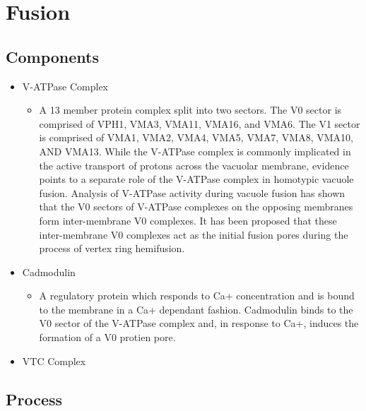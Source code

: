 \documentclass[12pt,twoside]{reedthesis}
\providecommand{\tightlist}{%
  \setlength{\itemsep}{0pt}\setlength{\parskip}{0pt}}
\begin{document}
\section{Fusion}\label{fusion}

\subsection{Components}\label{components-2}

\begin{itemize}
\tightlist
\item
  V-ATPase Complex

  \begin{itemize}
  \tightlist
  \item
    A 13 member protein complex split into two sectors. The V0 sector is comprised of VPH1, VMA3, VMA11, VMA16, and VMA6. The V1 sector is comprised of VMA1, VMA2, VMA4, VMA5, VMA7, VMA8, VMA10, AND VMA13. While the V-ATPase complex is commonly implicated in the active transport of protons across the vacuolar membrane, evidence points to a separate role of the V-ATPase complex in homotypic vacuole fusion. Analysis of V-ATPase activity during vacuole fusion has shown that the V0 sectors of V-ATPase complexes on the opposing membranes form inter-membrane V0 complexes. It has been proposed that these inter-membrane V0 complexes act as the initial fusion pores during the process of vertex ring hemifusion.
  \end{itemize}
\item
  Cadmodulin

  \begin{itemize}
  \tightlist
  \item
    A regulatory protein which responds to Ca+ concentration and is bound to the membrane in a Ca+ dependant fashion. Cadmodulin binds to the V0 sector of the V-ATPase complex and, in response to Ca+, induces the formation of a V0 protien pore.
  \end{itemize}
\item
  VTC Complex
\end{itemize}

\subsection{Process}\label{process-2}
\end{document}
